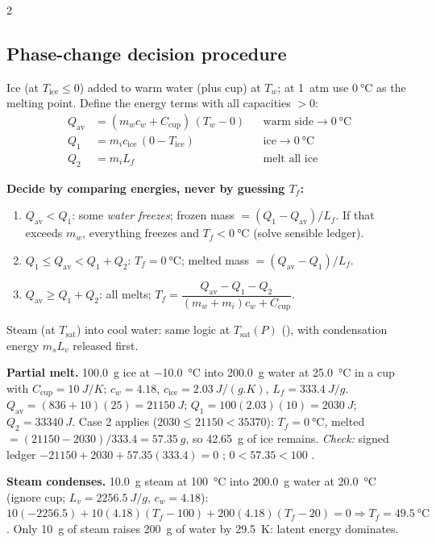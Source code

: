 \begin{multicols}{2}
\subsection{Phase-change decision procedure}\label{sec:phasedecision}
\CORE{} Ice (at $T_{\text{ice}}\le0$) added to warm water (plus cup) at $T_w$; at 1~atm use $\SI{0}{\celsius}$ as the melting point. Define the energy terms with all capacities $>0$:
\begin{align*}
Q_{\text{av}} &= (m_wc_w + C_{\text{cup}})\,(T_w-0) && \text{warm side}\to\SI{0}{\celsius}\\
Q_{1} &= m_ic_{\text{ice}}\,(0-T_{\text{ice}}) && \text{ice}\to\SI{0}{\celsius}\\
Q_{2} &= m_iL_f && \text{melt all ice}
\end{align*}
\begin{keybox}\textbf{Decide by comparing energies, never by guessing $T_f$:}
\begin{enumerate}
\item $Q_{\text{av}}<Q_1$: some \emph{water freezes}; frozen mass $=(Q_1-Q_{\text{av}})/L_f$. If that exceeds $m_w$, everything freezes and $T_f<\SI{0}{\celsius}$ (solve sensible ledger).
\item $Q_1\le Q_{\text{av}}<Q_1+Q_2$: $T_f=\SI{0}{\celsius}$; melted mass $=(Q_{\text{av}}-Q_1)/L_f$.
\item $Q_{\text{av}}\ge Q_1+Q_2$: all melts; $T_f=\dfrac{Q_{\text{av}}-Q_1-Q_2}{(m_w+m_i)c_w+C_{\text{cup}}}$.
\end{enumerate}
Steam (at $T_{\text{sat}}$) into cool water: same logic at $T_{\text{sat}}(P)$ (), with condensation energy $m_sL_v$ released first.\end{keybox}

\begin{demobox}\textbf{Partial melt.} \SI{100.0}{g} ice at \SI{-10.0}{\celsius} into \SI{200.0}{g} water at \SI{25.0}{\celsius} in a cup with $C_{\text{cup}}=\SI{10}{J/K}$; $c_w=4.18$, $c_{\text{ice}}=\SI{2.03}{J/(g.K)}$, $L_f=\SI{333.4}{J/g}$.
$Q_{\text{av}}=(836+10)(25)=\SI{21150}{J}$; $Q_1=100(2.03)(10)=\SI{2030}{J}$; $Q_2=\SI{33340}{J}$.
Case 2 applies ($2030\le21150<35370$): $T_f=\SI{0}{\celsius}$, melted $=(21150-2030)/333.4=\SI{57.35}{g}$, so \SI{42.65}{g} of ice remains.
\emph{Check:} signed ledger $-21150+2030+57.35(333.4)=0$ \checkmark; $0<57.35<100$ \checkmark.\end{demobox}

\begin{demobox}\textbf{Steam condenses.} \SI{10.0}{g} steam at \SI{100}{\celsius} into \SI{200.0}{g} water at \SI{20.0}{\celsius} (ignore cup; $L_v=\SI{2256.5}{J/g}$, $c_w=4.18$): $10(-2256.5)+10(4.18)(T_f-100)+200(4.18)(T_f-20)=0\Rightarrow T_f=\SI{49.5}{\celsius}$. Only \SI{10}{g} of steam raises \SI{200}{g} of water by \SI{29.5}{K}: latent energy dominates.\end{demobox}


\end{multicols}
